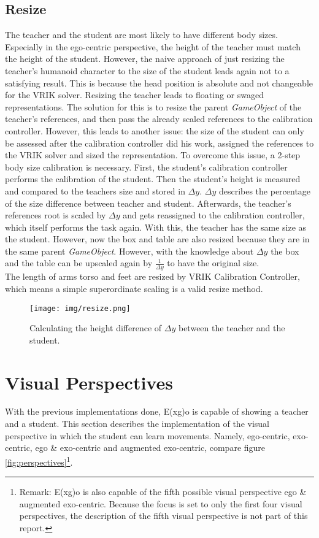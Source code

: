 \subsection{Resize}
The teacher and the student are most likely to have different body sizes. Especially in the ego-centric perspective, the height of the teacher must match the height of the student. However, the naive approach of just resizing the teacher's humanoid character to the size of the student leads again not to a satisfying result. This is because the head position is absolute and not changeable for the VRIK solver. Resizing the teacher leads to floating or swaged representations. The solution for this is to resize the parent \textit{GameObject} of the teacher's references, and then pass the already scaled references to the calibration controller. However, this leads to another issue: the size of the student can only be assessed after the calibration controller did his work, assigned the references to the VRIK solver and sized the representation. To overcome this issue, a 2-step body size calibration is necessary. First, the student's calibration controller performs the calibration of the student. Then the student's height is measured and compared to the teachers size and stored in $\Delta y$. $\Delta y$ describes the percentage of the size difference between teacher and student. Afterwards, the teacher's references root is scaled by $\Delta y$ and gets reassigned to the calibration controller, which itself performs the task again. With this, the teacher has the same size as the student. However, now the box and table are also resized because they are in the same parent \textit{GameObject}. However, with the knowledge about $\Delta y$ the box and the table can be upscaled again by $\frac{1}{\Delta y}$ to have the original size.\\
The length of arms torso and feet are resized by VRIK Calibration Controller, which means a simple superordinate scaling is a valid resize method.
\begin{figure}
	\centering
	\texttt{[image: img/resize.png]}
	\caption{Calculating the height difference of $\Delta y$ between the teacher and the student.}
	\label{fig:resize}
\end{figure}


\section{Visual Perspectives}
With the previous implementations done, E(x\textbar g)o is capable of showing a teacher and a student. This section describes the implementation of the visual perspective in which the student can learn movements. Namely, ego-centric, exo-centric, ego \& exo-centric and augmented exo-centric, compare figure \ref{fig:perspectives}\footnote{Remark: E(x\textbar g)o is also capable of the fifth possible visual perspective ego \& augmented exo-centric. Because the focus is set to only the first four visual perspectives, the description of the fifth visual perspective is not part of this report.}.

